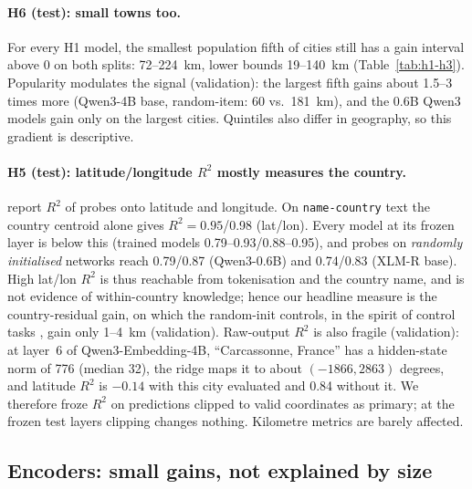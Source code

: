 \paragraph{H6 (test): small towns too.}
For every H1 model, the smallest population fifth of cities still has a gain interval above 0 on both splits: 72--224~km, lower bounds 19--140~km (Table~\ref{tab:h1-h3}). Popularity modulates the signal (validation): the largest fifth gains about 1.5--3 times more (Qwen3-4B base, random-item: 60 vs.\ 181~km), and the 0.6B Qwen3 models gain only on the largest cities. Quintiles also differ in geography, so this gradient is descriptive.

\paragraph{H5 (test): latitude/longitude $R^2$ mostly measures the country.}
\citet{gurnee2024space} report $R^2$ of probes onto latitude and longitude. On \texttt{name-country} text the country centroid alone gives $R^2=0.95$/0.98 (lat/lon). Every model at its frozen layer is below this (trained models 0.79--0.93/0.88--0.95), and probes on \emph{randomly initialised} networks reach 0.79/0.87 (Qwen3-0.6B) and 0.74/0.83 (XLM-R base). High lat/lon $R^2$ is thus reachable from tokenisation and the country name, and is not evidence of within-country knowledge; hence our headline measure is the country-residual gain, on which the random-init controls, in the spirit of control tasks \citep{hewitt2019control}, gain only 1--4~km (validation).
Raw-output $R^2$ is also fragile (validation): at layer~6 of Qwen3-Embedding-4B, ``Carcassonne, France'' has a hidden-state norm of 776 (median 32), the ridge maps it to about $(-1866, 2863)$ degrees, and latitude $R^2$ is $-0.14$ with this city evaluated and 0.84 without it. We therefore froze $R^2$ on predictions clipped to valid coordinates as primary; at the frozen test layers clipping changes nothing. Kilometre metrics are barely affected.

\subsection{Encoders: small gains, not explained by size}
\label{sec:res-encoders}

